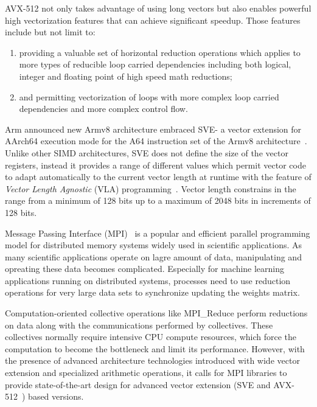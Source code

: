 \documentclass[sigconf]{acmart}
\newcommand{\mpi}[0]{\textsc{MPI}\xspace}
\newcommand{\arm}[0]{Arm\xspace}
\newcommand{\sve}[0]{\textsc{SVE}\xspace}
\begin{document}
AVX-512 not only takes advantage of using long vectors but also enables powerful high
vectorization features that can achieve significant speedup. Those features
include but not limit to:
\begin{enumerate}
  \item providing a valuable set of horizontal reduction operations which applies to more
  types of reducible loop carried dependencies including both logical, integer and floating point of high speed math reductions;
  \item and permitting vectorization of loops with more complex loop carried dependencies and more complex control flow.
\end{enumerate}

\arm announced new Armv8 architecture embraced \sve - a vector extension for AArch64
execution mode for the A64 instruction set of the
Armv8 architecture~\cite{arm-v8-ref, ARMv8-Architecture}.
Unlike other SIMD architectures, \sve does not define the size of
the vector registers, instead it provides a range of different values which permit vector
code to adapt automatically to the current vector length at runtime with the
feature of \emph{Vector Length Agnostic} (VLA) programming~\cite{Advanced-SIMD,vla-stencil}.
Vector length constrains in the range from a minimum of 128 bits up to
a maximum of 2048 bits in increments of 128 bits.

Message Passing Interface (\mpi)~\cite{mpi-forum} is a popular and efficient parallel
programming model for distributed memory systems widely used in scientific applications.
As many scientific applications operate on lagre amount of data, manipulating and opreating these data becomes complicated.
%
Especially for machine learning applications running on distributed systems,
processes need to use reduction operations for very large data sets to
synchronize updating the weights matrix.

Computation-oriented collective operations like MPI\_Reduce perform reductions on
data along with the communications performed by collectives.
These collectives normally require intensive CPU compute resources, which force
the computation to become the bottleneck and limit its performance.
However, with the presence of advanced architecture technologies introduced
with wide vector extension and specialized arithmetic operations, it calls for
MPI libraries to provide state-of-the-art design for advanced vector
extension (\sve and AVX-512~\cite{avx-info, Cebrian2019}) based versions.
\end{document}
